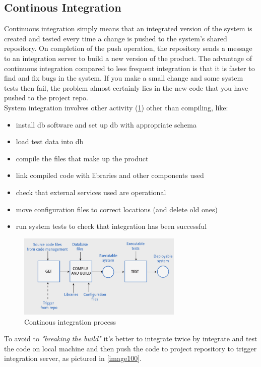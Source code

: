 \documentclass[10pt,a4paper]{report}
\begin{document}
\subsection{Continous Integration}
Continuous integration simply means that an integrated version of the system is created and tested every time a change is pushed to the system’s shared repository.
On completion of the push operation, the repository sends a message to an integration server to build a new version of the product. The advantage of continuous integration compared to less frequent integration is that it is faster to find and fix bugs in the system. If you make a small change and some system tests then fail, the problem almost certainly lies in the new code that you have pushed to the project repo.\\
System integration involves other activity (\ref{image99}) other than compiling, like:
\begin{itemize}
	\item install db software and set up db with appropriate schema
	\item load test data into db
	\item compile the files that make up the product
	\item link compiled code with libraries and other components used
	\item check that external services used are operational
	\item move configuration files to correct locations (and delete old ones)
	\item run system tests to check that integration has been successful
\end{itemize}
\begin{figure}[h]
	\centering
	\includegraphics[width=0.7\textwidth]{image99}
	\caption{Continous integration process}
	\label{image99}
\end{figure} 
To avoid to \textit{"breaking the build"} it's better to integrate twice by integrate and test the code on local machine and then push the code to project repository to trigger integration server, as pictured in \ref{image100}. 
\end{document}

